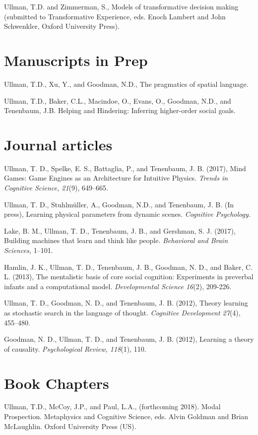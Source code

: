 \documentclass[margin,line,pifont,palatino,courier]{res}
\begin{document}
\begin{resume}
Ullman, T.D. and Zimmerman, S., Models of transformative decision making (submitted to Transformative Experience, eds. Enoch Lambert and John Schwenkler, Oxford University Press).

\section{\sc Manuscripts in Prep}
Ullman, T.D., Xu, Y., and Goodman, N.D., The pragmatics of spatial language. 

Ullman, T.D., Baker, C.L., Macindoe, O., Evans, O., Goodman, N.D., and Tenenbaum, J.B. Helping and Hindering: Inferring higher-order social goals. 

\section{\sc Journal articles}

Ullman, T. D., Spelke, E. S., Battaglia, P., and Tenenbaum, J. B. (2017), Mind Games: Game Engines as an Architecture for Intuitive Physics. \textit{Trends in Cognitive Science, 21}(9), 649--665.

Ullman, T. D., Stuhlm{\"u}ller, A., Goodman, N.D., and Tenenbaum, J. B. (In press), Learning physical parameters from dynamic scenes. \textit{Cognitive Psychology.}

Lake, B. M., Ullman, T. D., Tenenbaum, J. B., and Gershman, S. J. (2017), Building machines that learn and think like people. \textit{Behavioral and Brain Sciences,} 1--101.

Hamlin, J. K., Ullman, T. D., Tenenbaum, J. B., Goodman, N. D., and Baker, C. L. (2013), The mentalistic basis of core social cognition: Experiments in preverbal infants and a computational model. \textit{Developmental Science 16}(2), 209-226.

Ullman, T. D., Goodman, N. D., and Tenenbaum, J. B. (2012), Theory learning as stochastic search in the language of thought. \textit{Cognitive Development 27}(4), 455--480.

Goodman, N. D., Ullman, T. D., and Tenenbaum, J. B. (2012), Learning a theory of causality. \textit{Psychological Review, 118}(1), 110. 

\section{\sc Book Chapters}

Ullman, T.D., McCoy, J.P., and Paul, L.A., (forthcoming 2018). Modal Prospection. Metaphysics and Cognitive Science, eds. Alvin Goldman and Brian McLaughlin. Oxford University Press (US).


\end{resume}
\end{document}
